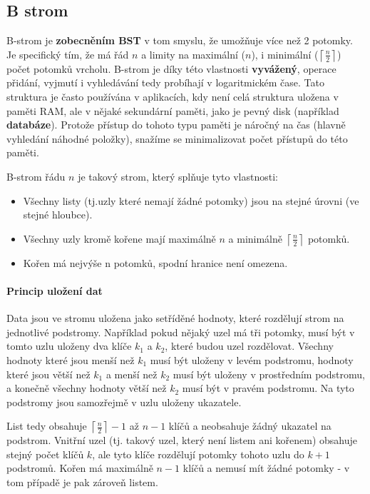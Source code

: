 \subsection{B strom}
B-strom je \textbf{zobecněním BST} v tom smyslu, že umožňuje více než 2 potomky. Je specifický tím, že má řád $n$ a limity na maximální ($n$), i minimální ($\left \lceil \frac{n}{2} \right \rceil$) počet potomků vrcholu. B-strom je díky této vlastnosti \textbf{vyvážený}, operace přidání, vyjmutí i vyhledávání tedy probíhají v logaritmickém čase. Tato struktura je často používána v aplikacích, kdy není celá struktura uložena v paměti RAM, ale v nějaké sekundární paměti, jako je pevný disk (například \textbf{databáze}). Protože přístup do tohoto typu paměti je náročný na čas (hlavně vyhledání náhodné položky), snažíme se minimalizovat počet přístupů do této paměti.

B-strom řádu $n$ je takový strom, který splňuje tyto vlastnosti:

\begin{itemize}[itemsep=0px]
\item Všechny listy (tj.uzly které nemají žádné potomky) jsou na stejné úrovni (ve stejné hloubce).
\item Všechny uzly kromě kořene mají maximálně $n$ a minimálně $\left \lceil \frac{n}{2} \right \rceil$ potomků.
\item Kořen má nejvýše n potomků, spodní hranice není omezena.
\end{itemize}

\paragraph{Princip uložení dat}
Data jsou ve stromu uložena jako setříděné hodnoty, které rozdělují strom na jednotlivé podstromy. Například pokud nějaký uzel má tři potomky, musí být v tomto uzlu uloženy dva klíče $k_1$ a $k_2$, které budou uzel rozdělovat. Všechny hodnoty které jsou menší než $k_1$ musí být uloženy v levém podstromu, hodnoty které jsou větší než $k_1$ a menší než $k_2$ musí být uloženy v prostředním podstromu, a konečně všechny hodnoty větší než $k_2$ musí být v pravém podstromu. Na tyto podstromy jsou samozřejmě v uzlu uloženy ukazatele.

List tedy obsahuje $\left \lceil \frac{n}{2} \right \rceil -1$ až $n-1$ klíčů a neobsahuje žádný ukazatel na podstrom. Vnitřní uzel (tj. takový uzel, který není listem ani kořenem) obsahuje stejný počet klíčů $k$, ale tyto klíče rozdělují potomky tohoto uzlu do $k+1$ podstromů.
Kořen má maximálně $n-1$ klíčů a nemusí mít žádné potomky - v tom případě je pak zároveň listem.

